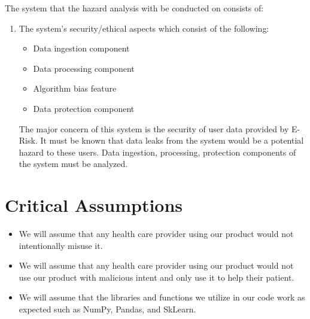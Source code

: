 \documentclass{article}
\begin{document}
The system that the hazard analysis with be conducted on consists of:
\begin{enumerate}
	\item The system's security/ethical aspects which consist of the following:
	      \begin{itemize}
		      \item Data ingestion component
		      \item Data processing component
		      \item Algorithm bias feature
		      \item Data protection component
	      \end{itemize}
	The major concern of this system is the security of user data provided by E-Risk. It must be known that data leaks from the system would be a potential hazard to these users. Data ingestion, processing, protection components of the system must be analyzed. 
\end{enumerate}

\section{Critical Assumptions}

\begin{itemize}
    \item We will assume that any health care provider using our product would not intentionally misuse it.
    \item We will assume that any health care provider using our product would not use our product with malicious intent and only use it to help their patient.
    \item We will assume that the libraries and functions we utilize in our code work as expected such as NumPy, Pandas, and SkLearn.
  \end{itemize}
\end{document}
